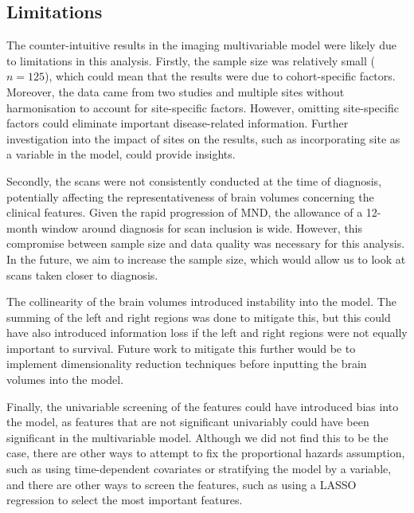 \subsection{Limitations}
The counter-intuitive results in the imaging multivariable model were likely due to limitations in this analysis.
Firstly, the sample size was relatively small ($n=125$), which could mean that the results were due to cohort-specific factors.
Moreover, the data came from two studies and multiple sites without harmonisation to account for site-specific factors.
However, omitting site-specific factors could eliminate important disease-related information.
Further investigation into the impact of sites on the results, such as incorporating site as a variable in the model, could provide insights.

Secondly, the scans were not consistently conducted at the time of diagnosis, potentially affecting the representativeness of brain volumes concerning the clinical features.
Given the rapid progression of MND, the allowance of a 12-month window around diagnosis for scan inclusion is wide. However, this compromise between sample size and data quality was necessary for this analysis.
In the future, we aim to increase the sample size, which would allow us to look at scans taken closer to diagnosis.

The collinearity of the brain volumes introduced instability into the model.
The summing of the left and right regions was done to mitigate this, but this could have also introduced information loss if the left and right regions were not equally important to survival.
Future work to mitigate this further would be to implement dimensionality reduction techniques before inputting the brain volumes into the model.

Finally, the univariable screening of the features could have introduced bias into the model, as features that are not significant univariably could have been significant in the multivariable model.
Although we did not find this to be the case, there are other ways to attempt to fix the proportional hazards assumption, such as using time-dependent covariates or stratifying the model by a variable, and there are other ways to screen the features, such as using a LASSO regression to select the most important features.


